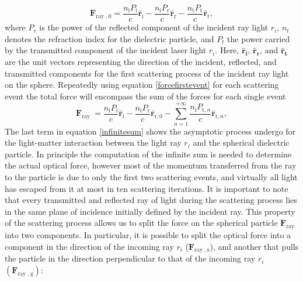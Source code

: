 \documentclass[letterpaper,12pt,oneside]{book}
\begin{document}
 \begin{equation}
\mathbf{F}_{\text {ray }, 0}=\frac{n_{\mathrm{i}} P_{\mathrm{i}}}{c} \hat{\mathbf{r}}_{\mathrm{i}}-\frac{n_{\mathrm{i}} P_{\mathrm{r}}}{c} \hat{\mathbf{r}}_{\mathrm{r}}-\frac{n_{\mathrm{t}} P_{\mathrm{t}}}{c} \hat{\mathbf{r}}_{\mathrm{t}},
\label{forcefirstevent}
\end{equation}
 where $P_r$ is the power of the reflected component of the incident ray light $r_i$, $n_t$ denotes the refraction index for the dielectric particle, and $P_t$ the power carried by the transmitted component of the incident laser light $r_i$. Here, $\mathbf{\hat{r}_i}$, $\mathbf{\hat{r}_r}$, and $\mathbf{\hat{r}_t}$ are the unit vectors representing the direction of the incident, reflected, and transmitted components for the first scattering process of the incident ray light on the sphere. Repeatedly using equation \eqref{forcefirstevent} for each scattering event the total force will encompass the sum of the forces for each single event 
 \begin{equation}
\mathbf{F}_{\text {ray }}=\frac{n_{\mathrm{i}} P_{\mathrm{i}}}{c} \hat{\mathbf{r}}_{\mathrm{i}}-\frac{n_{\mathrm{i}} P_{\mathrm{r}}}{c} \hat{\mathbf{r}}_{\mathrm{r}, 0}-\sum_{n=1}^{+\infty} \frac{n_{\mathrm{i}} P_{\mathrm{t}, n}}{c} \hat{\mathbf{r}}_{\mathrm{t}, n},
\label{infinitesum}
\end{equation}
The last term in equation \eqref{infinitesum} shows the 
asymptotic process undergo for the light-matter interaction between the light ray $r_i$ and the spherical dielectric particle. In principle the computation of the infinite sum is needed to determine the actual optical force, however most of the momentum transferred from the ray to the
particle is due to only the first two scattering events, and virtually all light has escaped from it at most in ten scattering iterations.
\newline It is important to note that every transmitted and reflected ray of light during the scattering process lies in the same plane of incidence initially defined by the incident ray. This property of the scattering process allows us to split the force on the spherical particle $\mathbf{F}_{\text {ray }}$ into two components. In particular, it is possible to split the optical force into a component in the direction of the incoming ray $r_i$ ($\mathbf{F}_{\text {ray }, \mathrm{s}}$), and another that
pulls the particle in the direction perpendicular to that of the incoming ray $r_i$ $(\mathbf{F}_{\text {ray }, \mathrm{g}})$:
\end{document}
